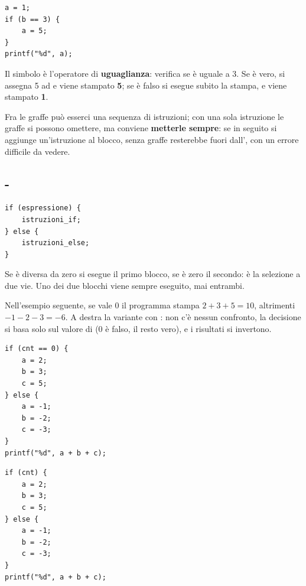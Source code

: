 \begin{affianco}[0.4][c]
\begin{lstlisting}[style=c]
a = 1;
if (b == 3) {
    a = 5;
}
printf("%d", a);
\end{lstlisting}
\risultato
Il simbolo \code{==} è l'operatore di \textbf{uguaglianza}: verifica se
 è uguale a 3. Se è vero, si assegna 5 ad  e viene stampato
\textbf{5}; se è falso si esegue subito la stampa, e viene stampato
\textbf{1}.
\end{affianco}


Fra le graffe può esserci una sequenza di istruzioni; con una sola
istruzione le graffe si possono omettere, ma conviene \textbf{metterle
sempre}: se in seguito si aggiunge un'istruzione al blocco, senza graffe
resterebbe fuori dall', con un errore difficile da vedere.

\subsection{-}

\begin{affianco}[0.4][c]
\begin{lstlisting}[style=c]
if (espressione) {
    istruzioni_if;
} else {
    istruzioni_else;
}
\end{lstlisting}
\risultato
Se  è diversa da zero si esegue il primo blocco, se è zero
il secondo: è la selezione a due vie. Uno dei due blocchi viene sempre
eseguito, mai entrambi.
\end{affianco}

Nell'esempio seguente, se  vale 0 il programma stampa
$2 + 3 + 5 = 10$, altrimenti $-1 - 2 - 3 = -6$. A destra la variante con
: non c'è nessun confronto, la decisione si basa solo sul
valore di  (0 è falso, il resto vero), e i risultati si
invertono.

\begin{affianco}[0.5]
\begin{lstlisting}[style=c]
if (cnt == 0) {
    a = 2;
    b = 3;
    c = 5;
} else {
    a = -1;
    b = -2;
    c = -3;
}
printf("%d", a + b + c);
\end{lstlisting}
\risultato
\begin{lstlisting}[style=c]
if (cnt) {
    a = 2;
    b = 3;
    c = 5;
} else {
    a = -1;
    b = -2;
    c = -3;
}
printf("%d", a + b + c);
\end{lstlisting}
\end{affianco}

